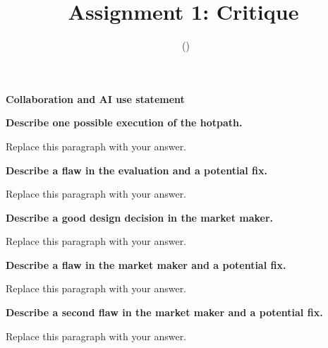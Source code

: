 \documentclass[11pt]{article}
\title{Assignment 1: Critique}
\author{\studentname\ (\netid)}
\date{}
\newcommand{\prompt}[1]{\par\medskip\noindent\textbf{#1}\par\smallskip\noindent\ignorespaces}
\begin{document}
\maketitle

\begin{center}
  \textbf{Collaboration and AI use statement}
\end{center}
\noindent{}

\clearpage

\prompt{Describe one possible execution of the hotpath.}
Replace this paragraph with your answer.

\prompt{Describe a flaw in the evaluation and a potential fix.}
Replace this paragraph with your answer.

\prompt{Describe a good design decision in the market maker.}
Replace this paragraph with your answer.

\prompt{Describe a flaw in the market maker and a potential fix.}
Replace this paragraph with your answer.

\prompt{Describe a second flaw in the market maker and a potential fix.}
Replace this paragraph with your answer.
\end{document}
